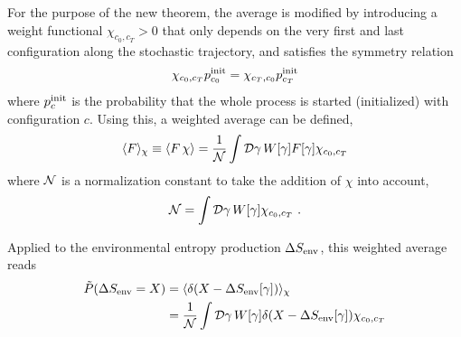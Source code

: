 For the purpose of the new theorem, the average  is modified by introducing a weight functional \(\chi_{c_0,c_T} > 0\) that only depends on the very first and last configuration along the stochastic trajectory, and satisfies the symmetry relation
%
\begin{align}
	\label{eqn:chi symmetry}
	\chi_{c_0,c_T}p_{c_0}^{\text{init}} = \chi_{c_T,c_0}p_{c_T}^{\text{init}}
\end{align}
%
where \(p_c^{\text{init}}\) is the probability that the whole process is started (initialized) with configuration \(c\). Using this, a weighted average can be defined,
%
\begin{align}
	\label{eqn:weighted functional average}
	\langle F\rangle_\chi
	\equiv \langle F \, \chi \rangle
	= \frac1{\mathcal{N}} \int \mathcal{D} \gamma\, W[\gamma] F[\gamma] \chi_{c_0,c_T}
\end{align}
%
where \(\mathcal{N}\) is a normalization constant to take the addition of \(\chi\) into account,
%
\begin{align}
	\label{eqn:weighted normalized}
	\mathcal{N} = \int\mathcal{D}\gamma \, W[\gamma] \chi_{c_0,c_T} ~.
\end{align}


Applied to the environmental entropy production \(\Delta S_\text{env}\), this weighted average reads
%
\begin{equation}
	\begin{split}
	\label{eqn:P(SEnv)}
	\tilde P(\Delta S_\text{env} = X)
	&= \langle \delta(X-\Delta S_\text{env}[\gamma])\rangle_\chi \\
	&= \frac1{\mathcal{N}} \int\mathcal{D}\gamma \, W[\gamma] \delta(X-\Delta S_\text{env}[\gamma]) \chi_{c_0,c_T}
	\end{split}
\end{equation}

